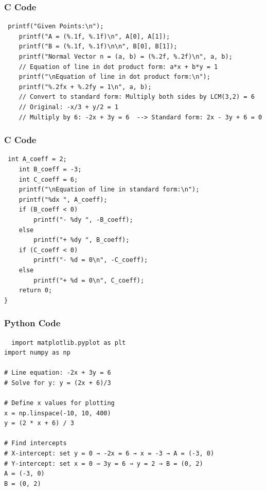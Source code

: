 \documentclass{beamer}
\begin{document}
\begin{frame}[fragile]
    \frametitle{C Code }
    \begin{lstlisting}
 printf("Given Points:\n");
    printf("A = (%.1f, %.1f)\n", A[0], A[1]);
    printf("B = (%.1f, %.1f)\n\n", B[0], B[1]);
    printf("Normal Vector n = (a, b) = (%.2f, %.2f)\n", a, b);
    // Equation of line in dot product form: a*x + b*y = 1
    printf("\nEquation of line in dot product form:\n");
    printf("%.2fx + %.2fy = 1\n", a, b);
    // Convert to standard form: Multiply both sides by LCM(3,2) = 6
    // Original: -x/3 + y/2 = 1
    // Multiply by 6: -2x + 3y = 6  --> Standard form: 2x - 3y + 6 = 0  
\end{lstlisting}
\end{frame}
\begin{frame}[fragile]
\frametitle{C Code }
\begin{lstlisting}
 int A_coeff = 2;
    int B_coeff = -3;
    int C_coeff = 6;
    printf("\nEquation of line in standard form:\n");
    printf("%dx ", A_coeff);
    if (B_coeff < 0)
        printf("- %dy ", -B_coeff);
    else
        printf("+ %dy ", B_coeff);
    if (C_coeff < 0)
        printf("- %d = 0\n", -C_coeff);
    else
        printf("+ %d = 0\n", C_coeff);
    return 0;
}

\end{lstlisting}
\end{frame}
\begin{frame}[fragile]
\frametitle{Python Code}
\begin{lstlisting}
  import matplotlib.pyplot as plt
import numpy as np

# Line equation: -2x + 3y = 6
# Solve for y: y = (2x + 6)/3

# Define x values for plotting
x = np.linspace(-10, 10, 400)
y = (2 * x + 6) / 3

# Find intercepts
# X-intercept: set y = 0 → -2x = 6 → x = -3 → A = (-3, 0)
# Y-intercept: set x = 0 → 3y = 6 → y = 2 → B = (0, 2)
A = (-3, 0)
B = (0, 2)
\end{lstlisting}
\end{frame}
\end{document}
